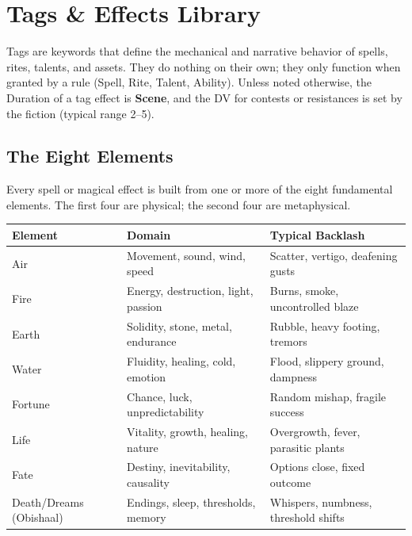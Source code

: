 
\section{Tags \& Effects Library}

Tags are keywords that define the mechanical and narrative behavior of spells, rites, talents, and assets. They do nothing on their own; they only function when granted by a rule (Spell, Rite, Talent, Ability). Unless noted otherwise, the Duration of a tag effect is \textbf{Scene}, and the DV for contests or resistances is set by the fiction (typical range 2--5).

\subsection{The Eight Elements}

Every spell or magical effect is built from one or more of the eight fundamental elements. The first four are physical; the second four are metaphysical.

\begin{tabular}{@{}l>{\raggedright\arraybackslash}p{3.2cm}>{\raggedright\arraybackslash}p{5.5cm}@{}}
\toprule
\textbf{Element} & \textbf{Domain} & \textbf{Typical Backlash} \\
\midrule
Air & Movement, sound, wind, speed & Scatter, vertigo, deafening gusts \\
Fire & Energy, destruction, light, passion & Burns, smoke, uncontrolled blaze \\
Earth & Solidity, stone, metal, endurance & Rubble, heavy footing, tremors \\
Water & Fluidity, healing, cold, emotion & Flood, slippery ground, dampness \\
Fortune & Chance, luck, unpredictability & Random mishap, fragile success \\
Life & Vitality, growth, healing, nature & Overgrowth, fever, parasitic plants \\
Fate & Destiny, inevitability, causality & Options close, fixed outcome \\
Death/Dreams (Obishaal) & Endings, sleep, thresholds, memory & Whispers, numbness, threshold shifts \\
\bottomrule
\end{tabular}

